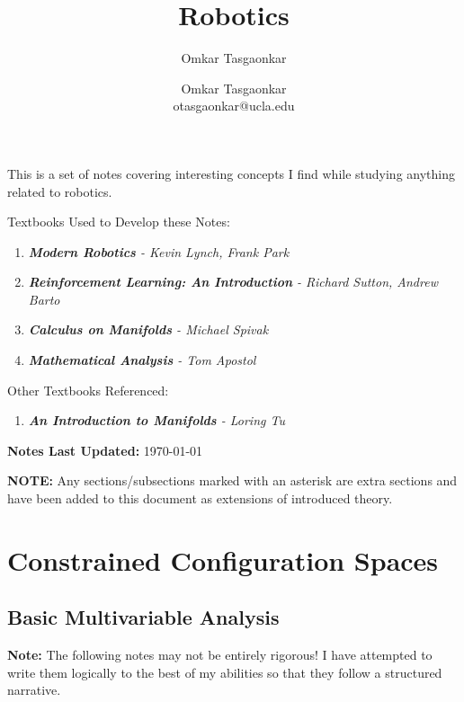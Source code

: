 \documentclass[10pt,letterpaper]{article} %
\author{Omkar Tasgaonkar}
\title{Robotics}
\author{Omkar Tasgaonkar \\ \small otasgaonkar@ucla.edu}
\date{}
\begin{document}
\maketitle
This is a set of notes covering interesting concepts I find while studying anything related to robotics.

\begin{tcolorbox}[colback=white, colframe=black, arc=0mm]
Textbooks Used to Develop these Notes:
\begin{enumerate}
\item \textit{\textbf{Modern Robotics} - Kevin Lynch, Frank Park}
\item \textit{\textbf{Reinforcement Learning: An Introduction} - Richard Sutton, Andrew Barto}
\item \textit{\textbf{Calculus on Manifolds} - Michael Spivak}
\item \textit{\textbf{Mathematical Analysis} - Tom Apostol}
\end{enumerate}
Other Textbooks Referenced:
\begin{enumerate}
\item \textit{\textbf{An Introduction to Manifolds} - Loring Tu}
\end{enumerate}
\end{tcolorbox}
\begin{tcolorbox}[colback=white, colframe=black, arc=0mm]
\textbf{Notes Last Updated:} \today
\end{tcolorbox}
\thispagestyle{firstpage}
\newpage
\begin{tcolorbox}[colback=white, colframe=black, arc=0mm]
\tableofcontents
\end{tcolorbox}
\textbf{NOTE:} Any sections/subsections marked with an asterisk are extra sections and have been added to this document as extensions of introduced theory.
\pagebreak

\section{Constrained Configuration Spaces}
\subsection{Basic Multivariable Analysis}
\textbf{Note:} The following notes may not be entirely rigorous! I have attempted to write them logically to the best of my abilities so that they follow a structured narrative.\\
\end{document}

